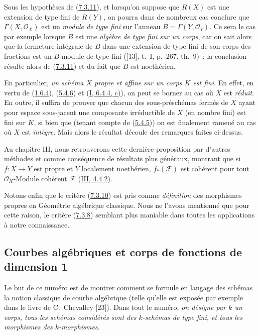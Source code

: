 \begin{remark}[7.3.12]
\label{II.7.3.12-fr}
Sous les hypothèses de (\hyperref[II.7.3.11-fr]{7.3.11}), et lorsqu'on suppose
que $R(X)$ est une extension de type fini de $R(Y)$, on pourra dans de nombreux
cas conclure que $\Gamma(X,\mathcal{O}_X)$ est un \emph{module de type fini}
sur l'anneau $B=\Gamma(Y,\mathcal{O}_Y)$. Ce sera le cas par exemple lorsque
$B$ est une \emph{algèbre de type fini sur un corps}, car on sait alors que la
fermeture intégrale de $B$ dans une extension de type fini de son corps des
fractions est un $B$-module de type fini ([13], t.~I, p.~267, th.~9)~; la
conclusion résulte alors de (\hyperref[II.7.3.11-fr]{7.3.11}) et du fait que
$B$ est noethérien.

En particulier, \emph{un schéma $X$ propre et affine sur un corps $K$ est
fini}. En effet, en vertu de (\hyperref[II.1.6.4-fr]{1.6.4}),
(\hyperref[II.5.4.6-fr]{5.4.6}) et
(\hyperref[I.6.4.4-fr]{I, 6.4.4, c)}), on peut se borner au cas où $X$ est
\emph{réduit}. En outre, il suffira de prouver que chacun des sous-préschémas
fermés de $X$ ayant pour espace sous-jacent une composante irréductible de $X$
(en nombre fini) est fini sur $K$, si bien que (tenant compte de
(\hyperref[II.5.4.5-fr]{5.4.5})) on est finalement ramené au cas où $X$ est
\emph{intègre}. Mais alors le résultat découle des remarques faites ci-dessus.

Au chapitre III, nous retrouverons cette dernière proposition par d'autres
méthodes et comme conséquence de résultats plus généraux, montrant que si
$f:X\to Y$ est propre et $Y$ localement noethérien, $f_*(\mathcal{F})$ est
cohérent pour tout $\mathcal{O}_X$-Module cohérent $\mathcal{F}$
(\hyperref[III.4.4.2-fr]{III, 4.4.2}).

Notons enfin que le critère (\hyperref[II.7.3.10-fr]{7.3.10}) est pris comme
\emph{définition} des morphismes propres en Géométrie algébrique classique.
Nous ne l'avons mentionné que pour cette raison, le critère
(\hyperref[II.7.3.8-fr]{7.3.8}) semblant plus maniable dans toutes les
applications à notre connaissance.
\end{remark}

\subsection{Courbes algébriques et corps de fonctions de dimension 1}
\label{subsection:II.7.4-fr}

Le but de ce numéro est de montrer comment se formule en langage des schémas
la notion classique de courbe algébrique (telle qu'elle est exposée par
exemple dans le livre de C.~Chevalley [23]). Dans tout le numéro, \emph{on
désigne par $k$ un corps, tous les schémas considérés sont des $k$-schémas de
type fini, et tous les morphismes des $k$-morphismes}.

